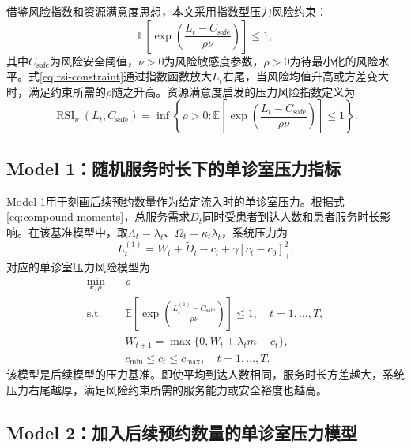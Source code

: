 \documentclass[a4paper,zihao=-4]{ctexart}
\newcommand{\E}{\mathbb{E}}
\newcommand{\RSI}{\operatorname{RSI}}
\numberwithin{figure}{section}
\numberwithin{table}{section}
\begin{document}
借鉴风险指数和资源满意度思想\citep{AumannSerrano2008,BrownSim2009,ZhouSimLam2022,XieLokeSimLam2023}，本文采用指数型压力风险约束：
\begin{equation}
\E\left[\exp\left(\frac{L_t-C_{\mathrm{safe}}}{\rho\nu}\right)\right]\leq 1,
\label{eq:rsi-constraint}
\end{equation}
其中$C_{\mathrm{safe}}$为风险安全阈值，$\nu>0$为风险敏感度参数，$\rho>0$为待最小化的风险水平。式\eqref{eq:rsi-constraint}通过指数函数放大$L_t$右尾，当风险均值升高或方差变大时，满足约束所需的$\rho$随之升高。资源满意度启发的压力风险指数定义为
\begin{equation}
\RSI_{\nu}(L_t,C_{\mathrm{safe}})
=\inf\left\{\rho>0:
\E\left[\exp\left(\frac{L_t-C_{\mathrm{safe}}}{\rho\nu}\right)\right]\leq 1
\right\}.
\end{equation}

\subsection{Model 1：随机服务时长下的单诊室压力指标}

Model 1用于刻画后续预约数量作为给定流入时的单诊室压力。根据式\eqref{eq:compound-moments}，总服务需求$\tilde D_t$同时受患者到达人数和患者服务时长影响。在该基准模型中，取$\Lambda_t=\lambda_t$、$\Omega_t=\kappa_t\lambda_t$，系统压力为
\begin{equation}
L_t^{(1)}=W_t+\tilde D_t-c_t+\gamma[c_t-c_0]_+^2.
\label{eq:model1-pressure}
\end{equation}
对应的单诊室压力风险模型为
\begin{equation}
\begin{aligned}
\min_{\bm{c},\rho}\quad & \rho\\
\mathrm{s.t.}\quad
& \E\left[\exp\left(\frac{L_t^{(1)}-C_{\mathrm{safe}}}{\rho\nu}\right)\right]\leq 1,\quad t=1,\ldots,T,\\
& W_{t+1}=\max\{0,W_t+\lambda_t m-c_t\},\\
& c_{\min}\leq c_t\leq c_{\max},\quad t=1,\ldots,T.
\end{aligned}
\label{eq:model1}
\end{equation}
该模型是后续模型的压力基准。即使平均到达人数相同，服务时长方差越大，系统压力右尾越厚，满足风险约束所需的服务能力或安全裕度也越高。

\subsection{Model 2：加入后续预约数量的单诊室压力模型}
\end{document}

